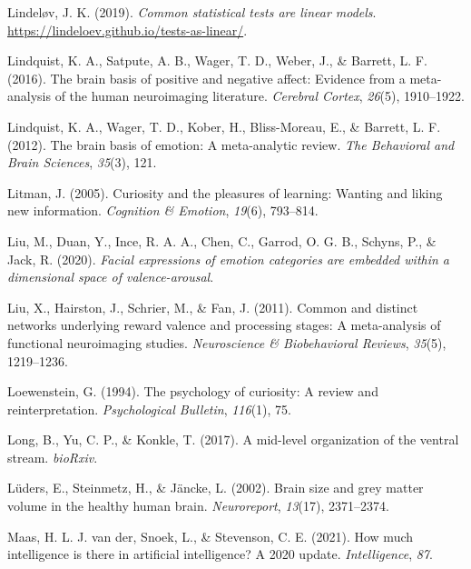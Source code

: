 \documentclass[11pt,american,]{memoir} %
\begin{document}
\leavevmode\hypertarget{ref-Lindelov2019-jk}{}%
Lindeløv, J. K. (2019). \emph{Common statistical tests are linear models}. \url{https://lindeloev.github.io/tests-as-linear/}.

\leavevmode\hypertarget{ref-lindquist2016brain}{}%
Lindquist, K. A., Satpute, A. B., Wager, T. D., Weber, J., \& Barrett, L. F. (2016). The brain basis of positive and negative affect: Evidence from a meta-analysis of the human neuroimaging literature. \emph{Cerebral Cortex}, \emph{26}(5), 1910--1922.

\leavevmode\hypertarget{ref-lindquist2012brain}{}%
Lindquist, K. A., Wager, T. D., Kober, H., Bliss-Moreau, E., \& Barrett, L. F. (2012). The brain basis of emotion: A meta-analytic review. \emph{The Behavioral and Brain Sciences}, \emph{35}(3), 121.

\leavevmode\hypertarget{ref-litman2005curiosity}{}%
Litman, J. (2005). Curiosity and the pleasures of learning: Wanting and liking new information. \emph{Cognition \& Emotion}, \emph{19}(6), 793--814.

\leavevmode\hypertarget{ref-Liu2020-vo}{}%
Liu, M., Duan, Y., Ince, R. A. A., Chen, C., Garrod, O. G. B., Schyns, P., \& Jack, R. (2020). \emph{Facial expressions of emotion categories are embedded within a dimensional space of valence-arousal}.

\leavevmode\hypertarget{ref-liu2011common}{}%
Liu, X., Hairston, J., Schrier, M., \& Fan, J. (2011). Common and distinct networks underlying reward valence and processing stages: A meta-analysis of functional neuroimaging studies. \emph{Neuroscience \& Biobehavioral Reviews}, \emph{35}(5), 1219--1236.

\leavevmode\hypertarget{ref-loewenstein1994psychology}{}%
Loewenstein, G. (1994). The psychology of curiosity: A review and reinterpretation. \emph{Psychological Bulletin}, \emph{116}(1), 75.

\leavevmode\hypertarget{ref-Long2017-fb}{}%
Long, B., Yu, C. P., \& Konkle, T. (2017). A mid-level organization of the ventral stream. \emph{bioRxiv}.

\leavevmode\hypertarget{ref-Luders2002-ms}{}%
Lüders, E., Steinmetz, H., \& Jäncke, L. (2002). Brain size and grey matter volume in the healthy human brain. \emph{Neuroreport}, \emph{13}(17), 2371--2374.

\leavevmode\hypertarget{ref-Van_der_Maas2021-rx}{}%
Maas, H. L. J. van der, Snoek, L., \& Stevenson, C. E. (2021). How much intelligence is there in artificial intelligence? A 2020 update. \emph{Intelligence}, \emph{87}.
\end{document}
